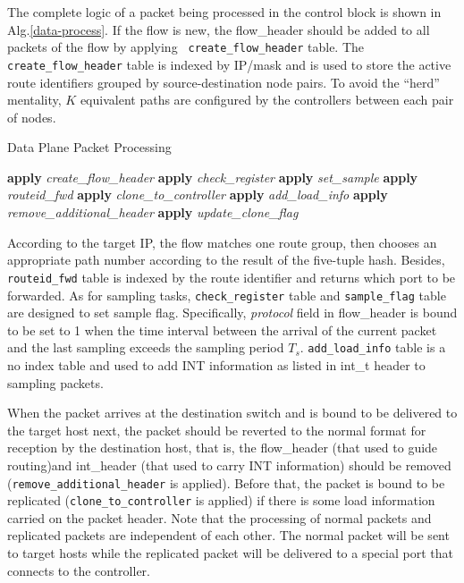 \documentclass[10pt,conference]{IEEEtran}
\begin{document}
The complete logic of a packet being processed in the control block is shown in Alg.\ref{data-process}. If the flow is new, the flow\_header should be added to all packets of the flow by applying \verb| create_flow_header| table. The \verb|create_flow_header| table is indexed by IP/mask and is used to store the active route identifiers grouped by source-destination node pairs. To avoid the ``herd'' mentality, $K$ equivalent paths are configured by the controllers between each pair of nodes. 
\begin{algorithm}
\caption{Data Plane Packet Processing}\label{data-process}
\begin{algorithmic}[1]
\State \textbf{apply} \emph{create\_flow\_header}
\State \textbf{apply} \emph{check\_register}
\State \textbf{apply} \emph{set\_sample}
\EndIf
\EndIf
\State \textbf{apply} \emph{routeid\_fwd}
\State \textbf{apply} \emph{clone\_to\_controller}
\EndIf
\EndProcedure
\State
{}
\State \textbf{apply} \emph{add\_load\_info}
\EndIf
{}
\State \textbf{apply} \emph{remove\_additional\_header}
\EndIf
{}
\State \textbf{apply} \emph{update\_clone\_flag}
\EndIf
\EndProcedure
\end{algorithmic}
\end{algorithm}
According to the target IP, the flow matches one route group, then chooses an appropriate path number according to the result of the five-tuple hash. Besides, \verb|routeid_fwd| table is indexed by the route identifier and returns which port to be forwarded. As for sampling tasks, \verb|check_register| table and \verb|sample_flag| table are designed to set sample flag. Specifically, \emph{protocol} field in flow\_header is bound to be set to 1 when the time interval between the arrival of the current packet and the last sampling exceeds the sampling period $T_s$. \verb|add_load_info| table is a no index table and used to add INT information as listed in int\_t header to sampling packets.

When the packet arrives at the destination switch and is bound to be delivered to the target host next, the packet should be reverted to the normal format for reception by the destination host, that is, the flow\_header (that used to guide routing)and int\_header (that used to carry INT information) should be removed (\verb|remove_additional_header| is applied). Before that, the packet is bound to be replicated (\verb|clone_to_controller| is applied) if there is some load information carried on the packet header. Note that the processing of normal packets and replicated packets are independent of each other. The normal packet will be sent to target hosts while the replicated packet will be delivered to a special port that connects to the controller.
\end{document}
